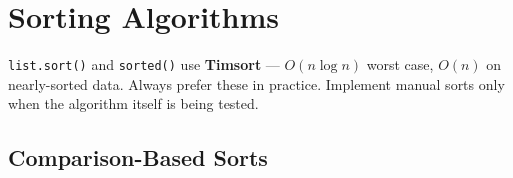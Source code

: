 \documentclass[11pt,a4paper]{report}
\begin{document}
\chapter{Sorting Algorithms}

\begin{notebox}
\texttt{list.sort()} and \texttt{sorted()} use \textbf{Timsort} --- $O(n \log n)$ worst case, $O(n)$ on nearly-sorted data. Always prefer these in practice. Implement manual sorts only when the algorithm itself is being tested.
\end{notebox}

\section{Comparison-Based Sorts}
\end{document}
